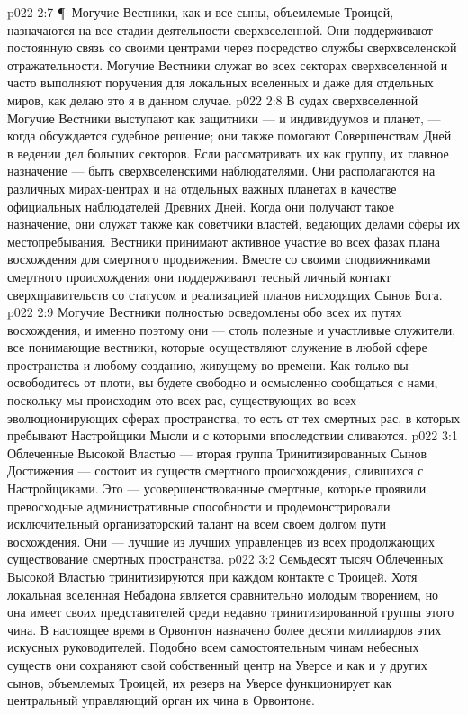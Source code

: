 \vs p022 2:7 \P\ Могучие Вестники, как и все сыны, объемлемые Троицей, назначаются на все стадии деятельности сверхвселенной. Они поддерживают постоянную связь со своими центрами через посредство службы сверхвселенской отражательности. Могучие Вестники служат во всех секторах сверхвселенной и часто выполняют поручения для локальных вселенных и даже для отдельных миров, как делаю это я в данном случае.
\vs p022 2:8 В судах сверхвселенной Могучие Вестники выступают как защитники --- и индивидуумов и планет, --- когда обсуждается судебное решение; они также помогают Совершенствам Дней в ведении дел больших секторов. Если рассматривать их как группу, их главное назначение --- быть сверхвселенскими наблюдателями. Они располагаются на различных мирах\hyp{}центрах и на отдельных важных планетах в качестве официальных наблюдателей Древних Дней. Когда они получают такое назначение, они служат также как советчики властей, ведающих делами сферы их местопребывания. Вестники принимают активное участие во всех фазах плана восхождения для смертного продвижения. Вместе со своими сподвижниками смертного происхождения они поддерживают тесный личный контакт сверхправительств со статусом и реализацией планов нисходящих Сынов Бога.
\vs p022 2:9 Могучие Вестники полностью осведомлены обо всех их путях восхождения, и именно поэтому они --- столь полезные и участливые служители, все понимающие вестники, которые осуществляют служение в любой сфере пространства и любому созданию, живущему во времени. Как только вы освободитесь от плоти, вы будете свободно и осмысленно сообщаться с нами, поскольку мы происходим ото всех рас, существующих во всех эволюционирующих сферах пространства, то есть от тех смертных рас, в которых пребывают Настройщики Мысли и с которыми впоследствии сливаются.
\vs p022 3:1 Облеченные Высокой Властью --- вторая группа Тринитизированных Сынов Достижения --- состоит из существ смертного происхождения, слившихся с Настройщиками. Это --- усовершенствованные смертные, которые проявили превосходные административные способности и продемонстрировали исключительный организаторский талант на всем своем долгом пути восхождения. Они --- лучшие из лучших управленцев из всех продолжающих существование смертных пространства.
\vs p022 3:2 Семьдесят тысяч Облеченных Высокой Властью тринитизируются при каждом контакте с Троицей. Хотя локальная вселенная Небадона является сравнительно молодым творением, но она имеет своих представителей среди недавно тринитизированной группы этого чина. В настоящее время в Орвонтон назначено более десяти миллиардов этих искусных руководителей. Подобно всем самостоятельным чинам небесных существ они сохраняют свой собственный центр на Уверсе и как и у других сынов, объемлемых Троицей, их резерв на Уверсе функционирует как центральный управляющий орган их чина в Орвонтоне.
